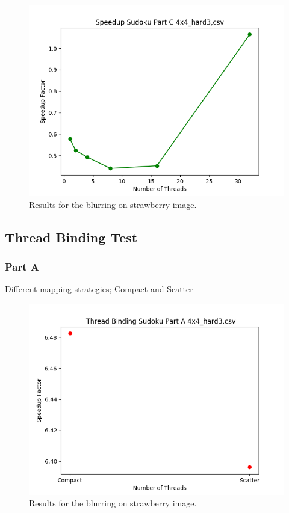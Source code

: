 \documentclass{article}
\begin{document}
\begin{figure}[!htb]
        \centering
        \includegraphics[width=1\linewidth]{./img/speedup_part_2_C.png}
        \caption{Results for the blurring on strawberry image.}
\end{figure}
    
\newpage

\subsection{Thread Binding Test}
\subsubsection{Part A}
\begin{description}
    \item[Different mapping strategies; Compact and Scatter]
\end{description}
\begin{figure}[!htb]
    \centering
    \includegraphics[width=1\linewidth]{./img/binding_part_2_A.png}
    \caption{Results for the blurring on strawberry image.}
\end{figure}
\end{document}
